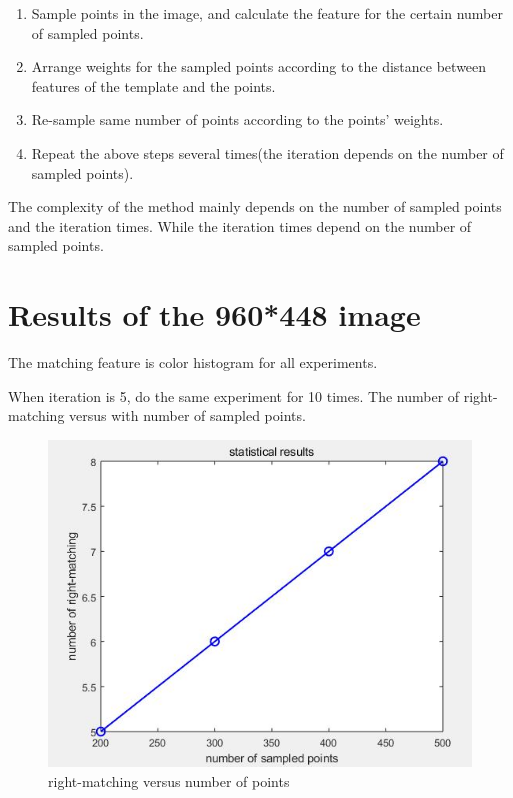 \begin{enumerate}
\item Sample points in the image, and calculate the feature for the certain number of sampled points.
\item Arrange weights for the sampled points according to the distance between features of the template and the points.
\item Re-sample same number of points according to the points' weights.
\item Repeat the above steps several times(the iteration depends on the number of sampled points).
\end{enumerate}

The complexity of the method mainly depends on the number of sampled points and the iteration times. While the iteration times depend on the number of sampled points.

\section{Results of the 960*448 image}

The matching feature is color histogram for all experiments.

When iteration is 5, do the same experiment for 10 times. The number of right-matching versus with number of sampled points.

\begin{figure}[H]
\centering%
\includegraphics[width=5in]{iterationD.jpg}
\caption{right-matching versus number of points}
\label{Fig.1}
\end{figure}

